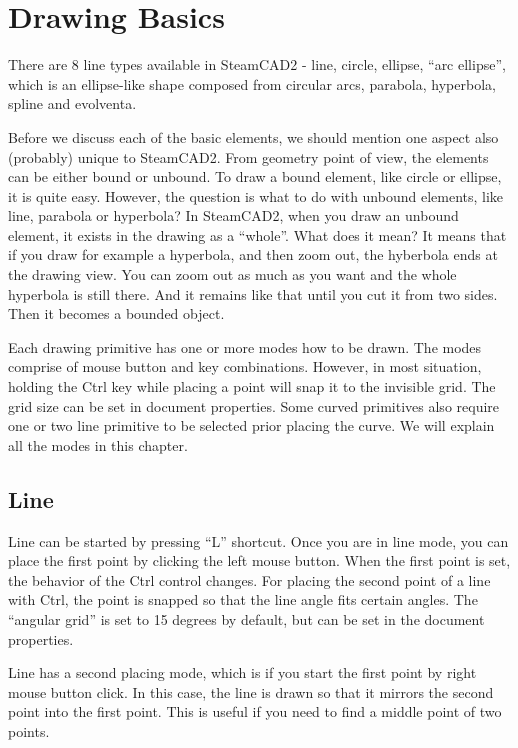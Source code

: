 \chapter{Drawing Basics}\label{chap:chap1}

There are 8 line types available in SteamCAD2 - line, circle, ellipse, ``arc ellipse'',
which is an ellipse-like shape composed from circular arcs, parabola, hyperbola,
spline and evolventa.

Before we discuss each of the basic elements, we should mention one aspect also
(probably) unique to SteamCAD2. From geometry point of view, the elements can be either
bound or unbound. To draw a bound element, like circle or ellipse, it is quite easy.
However, the question is what to do with unbound elements, like line, parabola or
hyperbola? In SteamCAD2, when you draw an unbound element, it exists in the drawing
as a ``whole''. What does it mean? It means that if you draw for example a hyperbola,
and then zoom out, the hyberbola ends at the drawing view. You can zoom out as
much as you want and the whole hyperbola is still there. And it remains like that
until you cut it from two sides. Then it becomes a bounded object.

Each drawing primitive has one or more modes how to be drawn. The modes comprise of
mouse button and key combinations. However, in most situation, holding the Ctrl key
while placing a point will snap it to the invisible grid. The grid size can be set
in document properties. Some curved primitives also require one or two line primitive
to be selected prior placing the curve. We will explain all the modes in this chapter.

\section{Line}\label{draw:line}

Line can be started by pressing ``L'' shortcut. Once you are in line mode, you can place
the first point by clicking the left mouse button. When the first point is set, the
behavior of the Ctrl control changes. For placing the second point of a line with Ctrl,
the point is snapped so that the line angle fits certain angles. The ``angular grid''
is set to 15 degrees by default, but can be set in the document properties.

Line has a second placing mode, which is if you start the first point by right mouse
button click. In this case, the line is drawn so that it mirrors the second point into
the first point. This is useful if you need to find a middle point of two points.

